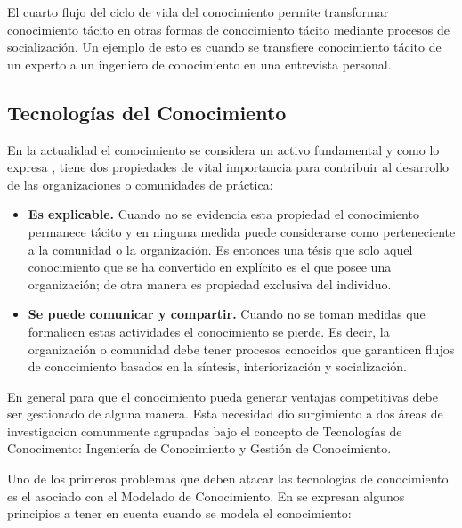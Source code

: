 El cuarto flujo del ciclo de vida del conocimiento permite transformar conocimiento tácito en otras formas de conocimiento tácito mediante procesos de socialización. Un ejemplo de esto es cuando se transfiere conocimiento tácito de un experto a un ingeniero de conocimiento en una entrevista personal.

\subsection{Tecnologías del Conocimiento}

En la actualidad el conocimiento se considera un activo fundamental y como lo expresa \cite{gang2007}, tiene dos propiedades de vital importancia para contribuir al desarrollo de las organizaciones o comunidades de práctica:

\begin{itemize}
\item \textbf{Es explicable.} Cuando no se evidencia esta propiedad el conocimiento permanece tácito y en ninguna medida puede considerarse como perteneciente a la comunidad o la organización. Es entonces una tésis que solo aquel conocimiento que se ha convertido en explícito es el que posee una organización; de otra manera es propiedad exclusiva del individuo.

\item \textbf{Se puede comunicar y compartir.} Cuando no se toman medidas que formalicen estas actividades el conocimiento se pierde. Es decir, la organización o comunidad debe tener procesos conocidos que garanticen flujos de conocimiento basados en la síntesis, interiorización y socialización.
\end{itemize}

En general para que el conocimiento pueda generar ventajas competitivas debe ser gestionado de alguna manera. Esta necesidad dio surgimiento a dos áreas de investigacion comunmente agrupadas bajo el concepto de Tecnologías de Conocimento: Ingeniería de Conocimiento y Gestión de Conocimiento. 

Uno de los primeros problemas que deben atacar las tecnologías de conocimiento es el asociado con el Modelado de Conocimiento. En \cite{benafia2016} se expresan algunos principios a tener en cuenta cuando se modela el conocimiento:

